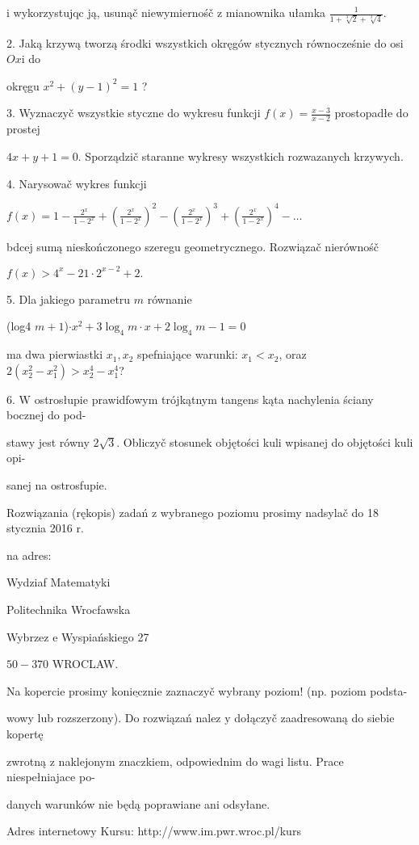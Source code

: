 \documentclass[a4paper,12pt]{article}
\begin{document}
$\mathrm{i}$ wykorzystujqc ją, usunąč niewymiernośč $\mathrm{z}$ mianownika ułamka $\displaystyle \frac{1}{1+\sqrt[3]{2}+\sqrt[3]{4}}.$

2. Jaką krzywą tworzą środki wszystkich okręgów stycznych równocześnie do osi $Ox\mathrm{i}$ do

okręgu $x^{2}+(y-1)^{2}=1$ ?

3. Wyznaczyč wszystkie styczne do wykresu funkcji $f(x)=\displaystyle \frac{x-3}{x-2}$ prostopadłe do prostej

$4x+y+1=0$. Sporządzič staranne wykresy wszystkich rozwazanych krzywych.

4. Narysowač wykres funkcji

$ f(x)=1-\displaystyle \frac{2^{x}}{1-2^{x}}+(\frac{2^{x}}{1-2^{x}})^{2}-(\frac{2^{x}}{1-2^{x}})^{3}+(\frac{2^{x}}{1-2^{x}})^{4}-\ldots$

bdcej sumą nieskończonego szeregu geometrycznego. Rozwiązač nierównośč

$f(x)>4^{x}-21\cdot 2^{x-2}+2.$

5. Dla jakiego parametru $m$ równanie

(log4 $m+1$)$\cdot x^{2}+3\log_{4}m\cdot x+2\log_{4}m-1=0$

ma dwa pierwiastki $x_{1}, x_{2}$ spefniające warunki: $x_{1}<x_{2}$, oraz $2(x_{2}^{2}-x_{1}^{2})>x_{2}^{4}-x_{1}^{4}$?

6. $\mathrm{W}$ ostrosłupie prawidfowym trójkątnym tangens kąta nachylenia ściany bocznej do pod-

stawy jest równy $2\sqrt{3}$. Obliczyč stosunek objętości kuli wpisanej do objętości kuli opi-

sanej na ostrosfupie.

Rozwiązania (rękopis) zadań z wybranego poziomu prosimy nadsylač do 18 stycznia 2016 r.

na adres:

Wydziaf Matematyki

Politechnika Wrocfawska

Wybrzez $\mathrm{e}$ Wyspiańskiego 27

$50-370$ WROCLAW.

Na kopercie prosimy $\underline{\mathrm{k}\mathrm{o}\mathrm{n}\mathrm{i}\mathrm{e}\mathrm{c}\mathrm{z}\mathrm{n}\mathrm{i}\mathrm{e}}$ zaznaczyč wybrany poziom! (np. poziom podsta-

wowy lub rozszerzony). Do rozwiązań nalez $\mathrm{y}$ dołączyč zaadresowaną do siebie kopertę

zwrotną $\mathrm{z}$ naklejonym znaczkiem, odpowiednim do wagi listu. Prace niespełniajace po-

danych warunków nie będą poprawiane ani odsyłane.

Adres internetowy Kursu: http://www.im.pwr.wroc.pl/kurs
\end{document}
